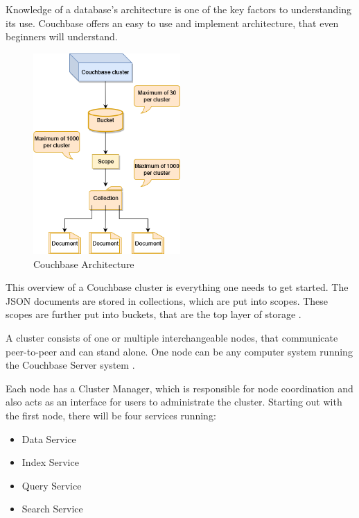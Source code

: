 Knowledge of a database's architecture is one of the key factors to understanding its use. Couchbase offers an easy to use and implement architecture, that even beginners will understand.

\begin{figure}[H]
    \centering
    \caption{Couchbase Architecture \parencite{CouchbaseArchitecture}} \label{fig:CouchbaseArchitecture}
    \includegraphics[width=0.5\textwidth]{images/CouchbaseArchitecture.drawio.png}
\end{figure}

This overview of a Couchbase cluster is everything one needs to get started. The \ac{JSON} documents are stored in collections, which are put into scopes. These scopes are further put into buckets, that are the top layer of storage \parencite{CouchbaseIntroduction}.

A cluster consists of one or multiple interchangeable nodes, that communicate peer-to-peer and can stand alone. One node can be any computer system running the Couchbase Server system \parencite{CouchbasePaper}.

Each node has a Cluster Manager, which is responsible for node coordination and also acts as an interface for users to administrate the cluster. Starting out with the first node, there will be four services running:

\begin{itemize}
    \item Data Service
    \item Index Service
    \item Query Service
    \item Search Service
\end{itemize}

